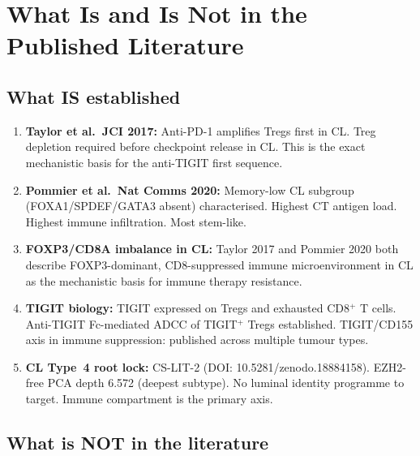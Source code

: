 \documentclass[12pt, a4paper]{article}
\begin{document}
\section{What Is and Is Not in the Published
Literature}

\subsection{What IS established}

\begin{enumerate}
    \item \textbf{Taylor et al.\ JCI 2017:}
    Anti-PD-1 amplifies Tregs first in CL.
    Treg depletion required before checkpoint
    release in CL. This is the exact mechanistic
    basis for the anti-TIGIT first sequence.

    \item \textbf{Pommier et al.\ Nat Comms 2020:}
    Memory-low CL subgroup (FOXA1/SPDEF/GATA3
    absent) characterised. Highest CT antigen
    load. Highest immune infiltration. Most
    stem-like.

    \item \textbf{FOXP3/CD8A imbalance in CL:}
    Taylor 2017 and Pommier 2020 both describe
    FOXP3-dominant, CD8-suppressed immune
    microenvironment in CL as the mechanistic
    basis for immune therapy resistance.

    \item \textbf{TIGIT biology:}
    TIGIT expressed on Tregs and exhausted
    CD8$^+$ T cells. Anti-TIGIT Fc-mediated
    ADCC of TIGIT$^+$ Tregs established.
    TIGIT/CD155 axis in immune suppression:
    published across multiple tumour types.

    \item \textbf{CL Type~4 root lock:}
    CS-LIT-2 (DOI: 10.5281/zenodo.18884158).
    EZH2-free PCA depth 6.572 (deepest subtype).
    No luminal identity programme to target.
    Immune compartment is the primary axis.
\end{enumerate}

\subsection{What is NOT in the literature}
\end{document}
